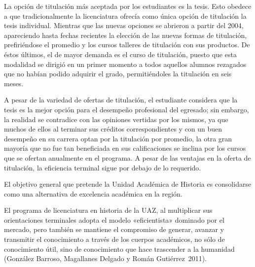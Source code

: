 La opción de titulación más aceptada por los estudiantes es la tesis. 
Esto obedece a que tradicionalmente la licenciatura ofrecía como única 
opción de titulación la tesis individual. Mientras que las nuevas 
opciones se abrieron a partir del 2004, apareciendo hasta fechas recientes la 
elección de las nuevas formas de titulación, prefiriéndose el promedio  
y los cursos talleres de titulación con sus productos. De éstos últimos, 
el de mayor demanda es el curso de titulación, puesto que esta 
modalidad se dirigió en un primer momento a todos aquellos alumnos 
rezagados que no habían podido adquirir el grado, permitiéndoles la 
titulación en seis meses.

A pesar de la variedad de ofertas de titulación, el estudiante considera 
que la tesis es la mejor opción para el desempeño profesional del 
egresado; sin embargo, la realidad se contradice con las opiniones\linebreak 
vertidas por los mismos, ya que muchos de ellos al terminar sus créditos 
correspondientes y con un buen desempeño en su carrera optan por la 
titulación por promedio, la otra gran mayoría que no fue tan 
beneficiada en sus calificaciones se inclina por los cursos que se 
ofertan anualmente en el programa. A pesar de las ventajas en la oferta 
de titulación,  la eficiencia terminal sigue por debajo de lo requerido. 

El objetivo general que pretende la Unidad Académica de Historia es
consolidarse como una alternativa de excelencia académica en la región.

El programa de licenciatura en historia de la UAZ,  al
multiplicar sus orientaciones terminales adopta el modelo «eficientista»
dominado por el mercado, pero también se mantiene el compromiso de generar,
avanzar y transmitir el conocimiento a través de los cuerpos académicos, no
sólo de conocimiento útil, sino de conocimiento que hace trascender  a la
humanidad (González Barroso, Magallanes Delgado y Román
Gutiérrez~2011).

